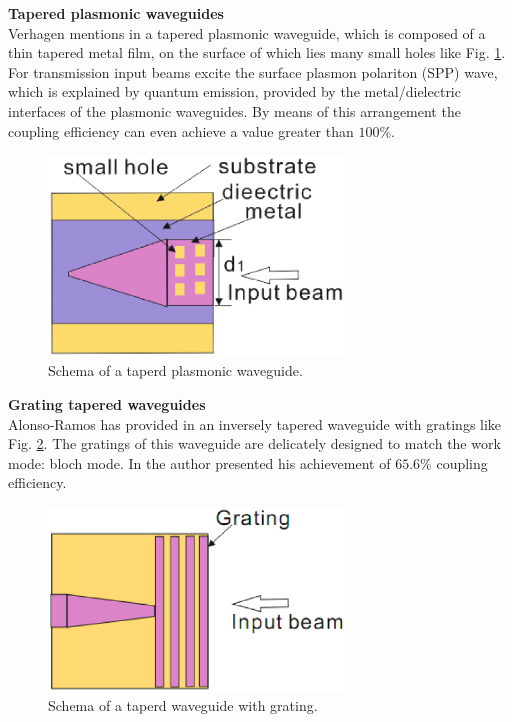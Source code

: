 \textbf{Tapered plasmonic waveguides}\\
Verhagen mentions in \cite{tapered_plasmonic_waveguides} a tapered plasmonic waveguide, which is composed of a thin tapered metal film, on the surface of which lies many small holes like Fig. \ref{fig:tapered_waveguide_plasmonic}. For transmission input beams excite the surface plasmon polariton (SPP) wave, which is explained by quantum emission, provided by the metal/dielectric interfaces of the plasmonic waveguides. By means of this arrangement the coupling efficiency can even achieve a value greater than $100\%$. 

\begin{figure}[!ht]
\centering
\includegraphics[width=0.7\textwidth]{bilder/tapered_waveguide_plasmonic}
\caption{Schema of a taperd plasmonic waveguide.}
\label{fig:tapered_waveguide_plasmonic}
\end{figure}

\textbf{Grating tapered waveguides}\\
Alonso-Ramos has provided in \cite{fiber_to_chip_grating_waveguides} an inversely tapered waveguide with gratings like Fig. \ref{fig:tapered_waveguide_grating}. The gratings of this waveguide are delicately designed to match the work mode: bloch mode. In \cite{fiber_to_chip_grating_waveguides} the author presented his achievement of $65.6\%$ coupling efficiency.  
\begin{figure}[!ht]
\centering
\includegraphics[width=0.7\textwidth]{bilder/tapered_waveguide_grating}
\caption{Schema of a taperd waveguide with grating.}
\label{fig:tapered_waveguide_grating}
\end{figure}
